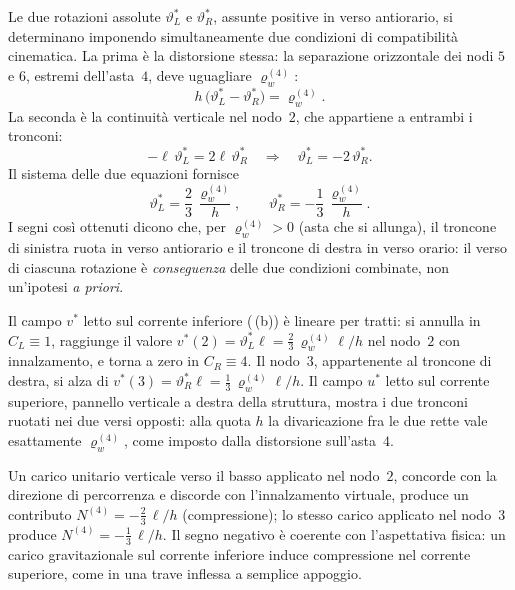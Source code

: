 \begin{esempio}
\begin{svolgimento}
		Le due rotazioni assolute $\vartheta_L^*$ e $\vartheta_R^*$,
		assunte positive in verso antiorario, si determinano imponendo
		simultaneamente due condizioni di compatibilità cinematica. La
		prima è la distorsione stessa: la separazione orizzontale dei
		nodi $5$ e $6$, estremi dell'asta~$4$, deve uguagliare
		$\varrho_w^{(4)}$:
		\begin{equation*}
			h\,\bigl(\vartheta_L^* - \vartheta_R^*\bigr) = \varrho_w^{(4)}.
		\end{equation*}
		La seconda è la continuità verticale nel nodo~$2$, che appartiene
		a entrambi i tronconi:
		\begin{equation*}
			-\ell\,\vartheta_L^* = 2\ell\,\vartheta_R^*
			\quad\Longrightarrow\quad
			\vartheta_L^* = -2\,\vartheta_R^*.
		\end{equation*}
		Il sistema delle due equazioni fornisce
		\begin{equation*}
			\vartheta_L^* = \frac{2}{3}\,\frac{\varrho_w^{(4)}}{h},
			\qquad
			\vartheta_R^* = -\frac{1}{3}\,\frac{\varrho_w^{(4)}}{h}.
		\end{equation*}
		I segni così ottenuti dicono che, per $\varrho_w^{(4)}>0$ (asta
		che si allunga), il troncone di sinistra ruota in verso antiorario
		e il troncone di destra in verso orario: il verso di ciascuna
		rotazione è \emph{conseguenza} delle due condizioni combinate, non
		un'ipotesi \emph{a priori}.
		
		Il campo $v^*$ letto sul corrente inferiore
		(\,(b)) è lineare per tratti:
		si annulla in $C_L\equiv 1$, raggiunge il valore
		$v^*(2)=\vartheta_L^*\ell=\tfrac{2}{3}\,\varrho_w^{(4)}\ell/h$
		nel nodo~$2$ con innalzamento, e torna a zero in $C_R\equiv 4$.
		Il nodo~$3$, appartenente al troncone di destra, si alza di
		$v^*(3)=\vartheta_R^*\ell=\tfrac{1}{3}\,\varrho_w^{(4)}\ell/h$.
		Il campo $u^*$ letto sul corrente superiore, pannello verticale
		a destra della struttura, mostra i due tronconi ruotati nei due
		versi opposti: alla quota $h$ la divaricazione fra le due rette
		vale esattamente $\varrho_w^{(4)}$, come imposto dalla distorsione
		sull'asta~$4$.
		
		Un carico unitario verticale verso il basso applicato nel nodo~$2$,
		concorde con la direzione di percorrenza e discorde con
		l'innalzamento virtuale, produce un contributo
		$N^{(4)}=-\tfrac{2}{3}\,\ell/h$ (compressione); lo stesso carico
		applicato nel nodo~$3$ produce $N^{(4)}=-\tfrac{1}{3}\,\ell/h$.
		Il segno negativo è coerente con l'aspettativa fisica: un carico
		gravitazionale sul corrente inferiore induce compressione nel
		corrente superiore, come in una trave inflessa a semplice appoggio.
		

\end{svolgimento}
\end{esempio}
